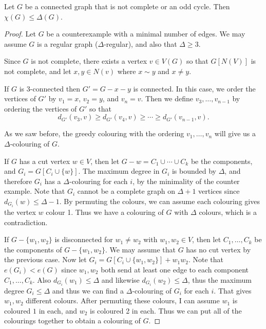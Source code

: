 \documentclass[a4paper]{scrartcl}
\begin{document}
\begin{theorem}
	Let $G$ be a connected graph that is not complete or an odd cycle. Then $\chi(G) \leq \Delta(G)$.
\end{theorem}
\begin{proof}
	Let $G$ be a counterexample with a minimal number of edges.
	We may assume $G$ is a regular graph ($\Delta$-regular), and also that $\Delta \geq 3$.

	Since $G$ is not complete, there exists a vertex $v \in V(G)$ so that $G[N(V)]$ is not complete, and let $x, y \in N(v)$ where $x \sim y$ and $x \neq y$. 

	If $G$ is 3-connected then $G' = G - x - y$ is connected. In this case, we order the vertices of $G'$ by $v_1 = x$, $v_2 = y$, and $v_n = v$. Then we define $v_3, \dots, v_{n - 1}$ by ordering the vertices of $G'$ so that
	$$
		d_{G'}(v_3, v) \geq d_{G'}(v_4, v) \geq \cdots \geq d_{G'}(v_{n - 1}, v).
	$$
	
	As we saw before, the greedy colouring with the ordering $v_1, \dots, v_n$ will give us a $\Delta$-colouring of $G$.

	If $G$ has a cut vertex $w \in V$, then let $G- w = C_1 \cup \cdots \cup C_k$ be the components, and $G_i = G[C_i \cup \{w\}]$. The maximum degree in $G_i$ is bounded by $\Delta$, and therefore $G_i$ has a $\Delta$-colouring for each $i$, by the minimality of the counter example. 
	Note that $G_i$ cannot be a complete graph on $\Delta + 1$ vertices since $d_{G_i}(w) \leq \Delta - 1$.
	By permuting the colours, we can assume each colouring gives the vertex $w$ colour 1. Thus we have a colouring of $G$ with $\Delta$ colours, which is a contradiction.

	If $G-\{w_1, w_2\}$ is disconnected for $w_1 \neq w_2$ with $w_1, w_2 \in V$, then let $C_1, \dots, C_k$ be the components of $G - \{w_1, w_2\}$. We may assume that $G$ has no cut vertex by the previous case. Now let $G_i = G[C_i \cup \{w_1, w_2\}]+ w_1w_2$. Note that $e(G_i) < e(G)$ since $w_1, w_2$ both send at least one edge to each component $C_1, \dots, C_k$. Also $d_{G_i}(w_1) \leq \Delta$ and likewise $d_{G_i}(w_2) \leq \Delta$, thus the maximum degree $G_i \leq \Delta$ and thus we can find a $\Delta$-colouring of $G_i$ for each $i$. That gives $w_1, w_2$ different colours. After permuting these colours, I can assume $w_1$ is coloured $1$ in each, and $w_2$ is coloured 2 in each. Thus we can put all of the colourings together to obtain a colouring of $G$.
\end{proof}
\end{document}
